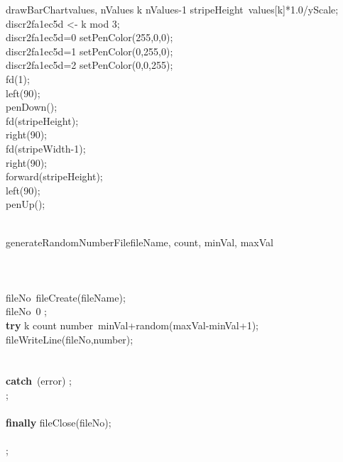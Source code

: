 \documentclass[a4paper,10pt]{article}
\begin{document}
\begin{pseudocode}{drawBarChart}{values, nValues }
  \FOR k  \TO nValues-1  \DO
  \BEGIN
    stripeHeight\gets\ values[k]*1.0/yScale;\\
    discr2fa1ec5d <- k mod 3;\\
    \IF discr2fa1ec5d=0 \THEN
      setPenColor(255,0,0);\\
    \ELSEIF discr2fa1ec5d=1 \THEN
      setPenColor(0,255,0);\\
    \ELSEIF discr2fa1ec5d=2 \THEN
      setPenColor(0,0,255);\\
    fd(1);\\
    left(90);\\
    penDown();\\
    fd(stripeHeight);\\
    right(90);\\
    fd(stripeWidth-1);\\
    right(90);\\
    forward(stripeHeight);\\
    left(90);\\
    penUp();\\
  \END\\
\ENDPROCEDURE
\end{pseudocode}


\begin{pseudocode}{generateRandomNumberFile}{fileName, count, minVal, maxVal }
\label{generateRandomNumberFile}
\\
\\
\\
\\
  fileNo\gets\ fileCreate(fileName);\\
  \IF fileNo\leq\ 0 \THEN
    ;\\
  \textbf{try} \BEGIN
    \FOR k  \TO count  \DO
    \BEGIN
      number\gets\ minVal+random(maxVal-minVal+1);\\
      fileWriteLine(fileNo,number);\\
    \END\\
  \END\\
  \textbf{catch}\ (error)\BEGIN
    ;\\
    ;\\
  \END\\
  \textbf{finally} \BEGIN
    fileClose(fileNo);\\
  \END\\
  ;\\
\ENDPROCEDURE
\end{pseudocode}
\end{document}
